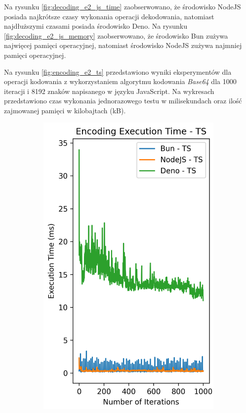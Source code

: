 Na rysunku \ref{fig:decoding_e2_js_time} zaobserwowano, że środowisko NodeJS posiada najkrótsze czasy wykonania operacji dekodowania, natomiast najdłuższymi czasami posiada środowisko Deno. Na rysunku \ref{fig:decoding_e2_js_memory} zaobserwowano, że środowisko Bun zużywa najwięcej pamięci operacyjnej, natomiast środowisko NodeJS zużywa najmniej pamięci operacyjnej.

Na rysunku \ref{fig:encoding_e2_ts} przedstawiono wyniki eksperymentów dla operacji kodowania z wykorzystaniem algorytmu kodowania \textit{Base64} dla 1000 iteracji i 8192 znaków napisanego w języku JavaScript. Na wykresach przedstawiono czas wykonania jednorazowego testu w milisekundach oraz ilość zajmowanej pamięci w kilobajtach (kB).

\begin{figure}[H]
  \centering
  \begin{subfigure}[b]{0.44\textwidth}
    \centering
    \includegraphics[width=\textwidth]{Figures/coding/base64_1000_encoding_ts_time.png}

\end{subfigure}
\end{figure}
